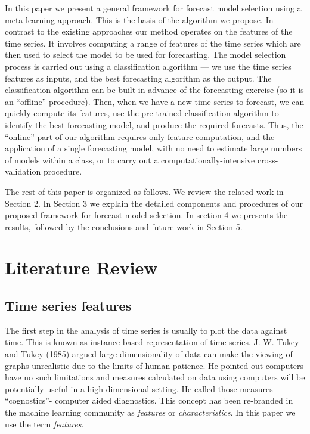 \documentclass[11pt,]{article}
\theoremstyle{definition}
\theoremstyle{definition}
\theoremstyle{definition}
\theoremstyle{remark}
\begin{document}
In this paper we present a general framework for forecast model
selection using a meta-learning approach. This is the basis of the
algorithm we propose. In contrast to the existing approaches our method
operates on the features of the time series. It involves computing a
range of features of the time series which are then used to select the
model to be used for forecasting. The model selection process is carried
out using a classification algorithm --- we use the time series features
as inputs, and the best forecasting algorithm as the output. The
classification algorithm can be built in advance of the forecasting
exercise (so it is an ``offline'' procedure). Then, when we have a new
time series to forecast, we can quickly compute its features, use the
pre-trained classification algorithm to identify the best forecasting
model, and produce the required forecasts. Thus, the ``online'' part of
our algorithm requires only feature computation, and the application of
a single forecasting model, with no need to estimate large numbers of
models within a class, or to carry out a computationally-intensive
cross-validation procedure.

The rest of this paper is organized as follows. We review the related
work in Section 2. In Section 3 we explain the detailed components and
procedures of our proposed framework for forecast model selection. In
section 4 we presents the results, followed by the conclusions and
future work in Section 5.

\newpage

\section{Literature Review}\label{literature-review}

\subsection{Time series features}\label{time-series-features}

The first step in the analysis of time series is usually to plot the
data against time. This is known as instance based representation of
time series. J. W. Tukey and Tukey (1985) argued large dimensionality of
data can make the viewing of graphs unrealistic due to the limits of
human patience. He pointed out computers have no such limitations and
measures calculated on data using computers will be potentially useful
in a high dimensional setting. He called those measures ``cognostics''-
computer aided diagnostics. This concept has been re-branded in the
machine learning community as \emph{features} or \emph{characteristics}.
In this paper we use the term \emph{features}.
\end{document}
